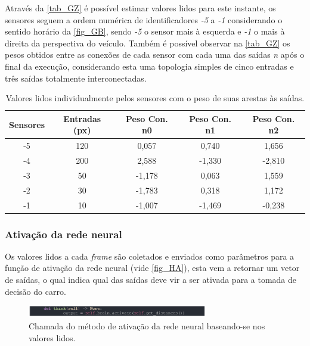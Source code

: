 Através da \autoref{tab_GZ} é possível estimar valores lidos para este instante, os sensores seguem a
ordem numérica de identificadores \textit{-5} a \textit{-1} considerando o sentido horário da \autoref{fig_GB}, sendo \textit{-5} o sensor
mais à esquerda e \textit{-1} o mais à direita da perspectiva do veículo. Também é possível observar na \autoref{tab_GZ}
os pesos obtidos entre as conexões de cada sensor com cada uma das saídas \textit{n} após o final da execução, considerando
esta uma topologia simples de cinco entradas e três saídas totalmente interconectadas.

\begin{table}[htb]
	\centering
    \caption{\label{tab_GZ}Valores lidos individualmente pelos sensores com o peso de suas arestas às saídas.}
    \begin{tabular}{ccccc}
        \hline
		\textbf{Sensores} & \textbf{Entradas (px)} & \textbf{Peso Con. n0} & \textbf{Peso Con. n1} & \textbf{Peso Con. n2} \\ \hline
		-5 & 120  & 0,057   & 0,740  & 1,656   \\ \hline
		-4 & 200  & 2,588   & -1,330  & -2,810   \\ \hline
		-3 & 50  & -1,178   & 0,063  & 1,559   \\ \hline
		-2 & 30  & -1,783   & 0,318  & 1,172  \\ \hline
		-1 & 10  & -1,007   & -1,469  & -0,238   \\ \hline
    \end{tabular}
\end{table}

\subsubsection{Ativação da rede neural}
Os valores lidos a cada \textit{frame} são coletados e enviados como parâmetros para a função de ativação da
rede neural (vide \autoref{fig_HA}), esta vem a retornar um vetor de saídas, o qual indica qual das saídas deve
vir a ser ativada para a tomada de decisão do carro.

\begin{figure}[htb]
        \centering
        \caption{\label{fig_HA}Chamada do método de ativação da rede neural baseando-se nos valores lidos.}
        \includegraphics[width=0.7\textwidth]{images/HA.png}
\end{figure}

